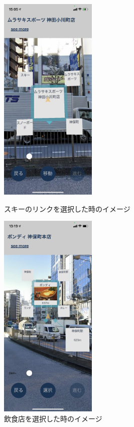 \begin{figure}[H]
  \begin{minipage}{0.5\hsize}
    \centering
    \includegraphics[height=100mm]{images/ar_navigation_jibotyo_ski.png}
    \caption{スキーのリンクを選択した時のイメージ} \label{fig:ar_navigation_jibotyo_ski}
  \end{minipage}
  \begin{minipage}{0.5\hsize}
    \centering
    \includegraphics[height=100mm]{images/ar_navigation_jibotyo_lunch.png}
    \caption{飲食店を選択した時のイメージ} \label{fig:ar_navigation_jibotyo_lunch}
  \end{minipage}
\end{figure}

